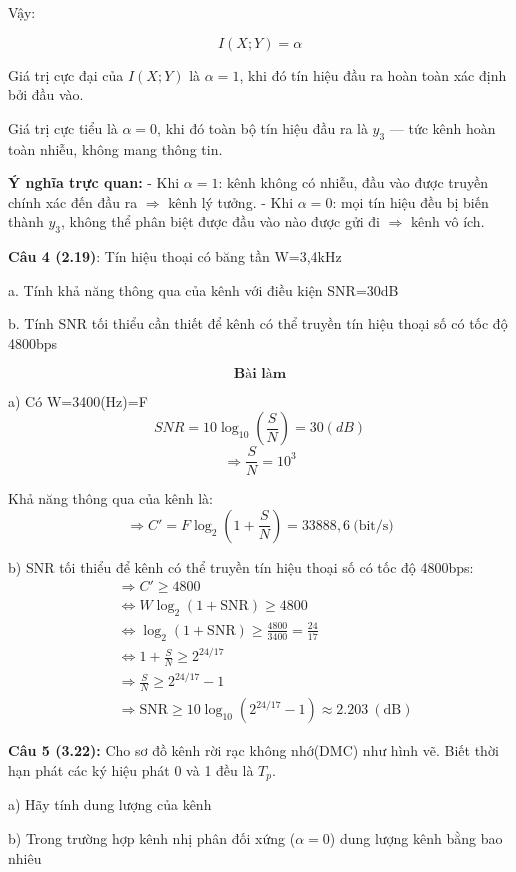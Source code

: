 \documentclass[12pt]{article}
\begin{document}
Vậy:

\[
I(X;Y) = \alpha
\]

Giá trị cực đại của $I(X;Y)$ là $\alpha = 1$, khi đó tín hiệu đầu ra hoàn toàn xác định bởi đầu vào.

Giá trị cực tiểu là $\alpha = 0$, khi đó toàn bộ tín hiệu đầu ra là $y_3$ — tức kênh hoàn toàn nhiễu, không mang thông tin.

\textbf{Ý nghĩa trực quan:}  
- Khi $\alpha = 1$: kênh không có nhiễu, đầu vào được truyền chính xác đến đầu ra $\Rightarrow$ kênh lý tưởng.  
- Khi $\alpha = 0$: mọi tín hiệu đều bị biến thành $y_3$, không thể phân biệt được đầu vào nào được gửi đi $\Rightarrow$ kênh vô ích.

\newpage
\textbf{Câu 4 (2.19)}: Tín hiệu thoại có băng tần W=3,4kHz

a. Tính khả năng thông qua của kênh với điều kiện SNR=30dB

b. Tính SNR tối thiểu cần thiết để kênh có thể truyền tín hiệu thoại số có tốc độ 4800bps

\[
\textbf{Bài làm}
\]

a) Có W=3400(Hz)=F
\[
SNR=10 \log_{10} \left( \frac{S}{N} \right)=30 (dB)
\]
\[
\Rightarrow \frac{S}{N} = 10^3
\]

Khả năng thông qua của kênh là:
\[
\Rightarrow C' = F \log_2\left(1 + \frac{S}{N}\right) = 33888{,}6\ \text{(bit/s)}
\]

b) SNR tối thiểu để kênh có thể truyền tín hiệu thoại số có tốc độ 4800bps:
\[
\begin{aligned}
&\Rightarrow C' \geq 4800 \\
&\Leftrightarrow W \log_2(1 + \text{SNR}) \geq 4800 \\
&\Leftrightarrow \log_2(1 + \text{SNR}) \geq \frac{4800}{3400} = \frac{24}{17} \\
&\Leftrightarrow 1 + \frac{S}{N} \geq 2^{24/17} \\
&\Rightarrow \frac{S}{N} \geq 2^{24/17} - 1 \\
&\Rightarrow \text{SNR} \geq 10 \log_{10}\left(2^{24/17} - 1\right) \approx 2.203 \ (\text{dB})
\end{aligned}
\]

\newpage
\textbf{Câu 5 (3.22):} Cho sơ đồ kênh rời rạc không nhớ(DMC) như hình vẽ. Biết thời hạn phát các ký hiệu phát 0 và 1 đều là $T_p$.

a) Hãy tính dung lượng của kênh 

b) Trong trường hợp kênh nhị phân đối xứng ($\alpha=0$) dung lượng kênh bằng bao nhiêu
\end{document}
